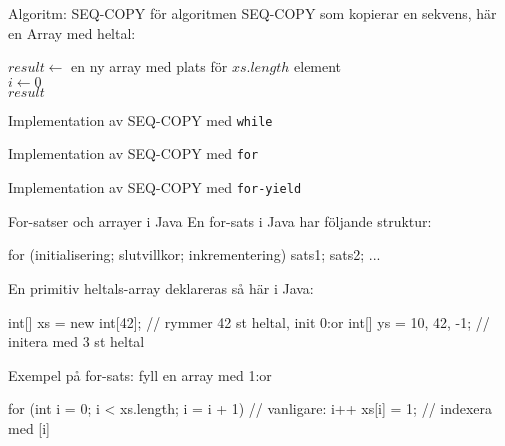 \begin{Slide}{Algoritm: SEQ-COPY}
 för algoritmen SEQ-COPY som kopierar en sekvens, här en Array med heltal:\\
\noindent\hrulefill
\begin{algorithm}[H]
 $result \leftarrow$ en ny array med plats för $xs.length$ element\\
 $i \leftarrow 0$  \\
 \Return $result$
\end{algorithm}
\noindent\hrulefill
\end{Slide}

\ifkompendium\else

\begin{Slide}{Implementation av SEQ-COPY med \texttt{while}}

\end{Slide}

\begin{Slide}{Implementation av SEQ-COPY med \texttt{for}}

\end{Slide}

\begin{Slide}{Implementation av SEQ-COPY med \texttt{for-yield}}

\end{Slide}


\begin{Slide}{For-satser och arrayer i Java}
En for-sats i Java har följande struktur:
\begin{Code}[language=Java, basicstyle=\fontsize{10}{12}\ttfamily\selectfont]
for (initialisering; slutvillkor; inkrementering) {
    sats1;
    sats2;
    ...
}
\end{Code}
En primitiv heltals-array deklareras så här i Java:
\begin{Code}[language=Java, basicstyle=\fontsize{9}{11}\ttfamily\selectfont]
int[] xs = new int[42];  // rymmer 42 st heltal, init 0:or
int[] ys = {10, 42, -1}; // initera med 3 st heltal  
\end{Code}
Exempel på for-sats: fyll en array med 1:or 
\begin{Code}[language=Java, basicstyle=\fontsize{9}{11}\ttfamily\selectfont]
for (int i = 0; i < xs.length; i = i + 1){ // vanligare: i++
  xs[i] = 1;                             // indexera med [i]
}
\end{Code}

\end{Slide}


